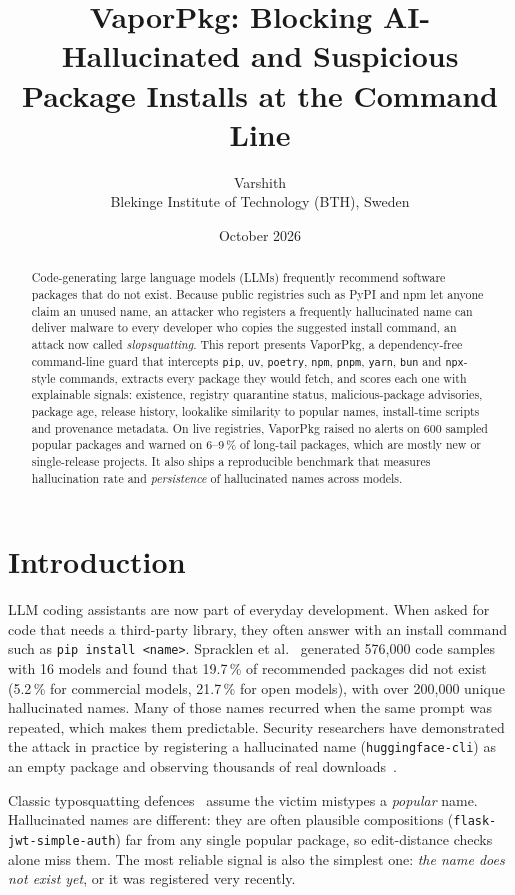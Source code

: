 \documentclass[11pt,a4paper]{article}
\title{\textbf{VaporPkg}: Blocking AI-Hallucinated and Suspicious\\ Package Installs at the Command Line}
\author{Varshith\\ \small Blekinge Institute of Technology (BTH), Sweden}
\date{October 2026}
\begin{document}
\maketitle

\begin{abstract}
Code-generating large language models (LLMs) frequently recommend software packages that do not exist.
Because public registries such as PyPI and npm let anyone claim an unused name, an attacker who registers
a frequently hallucinated name can deliver malware to every developer who copies the suggested install
command, an attack now called \emph{slopsquatting}. This report presents VaporPkg, a dependency-free
command-line guard that intercepts \texttt{pip}, \texttt{uv}, \texttt{poetry}, \texttt{npm}, \texttt{pnpm},
\texttt{yarn}, \texttt{bun} and \texttt{npx}-style commands, extracts every package they would fetch, and
scores each one with explainable signals: existence, registry quarantine status, malicious-package
advisories, package age, release history, lookalike similarity to popular names, install-time scripts and
provenance metadata. On live registries, VaporPkg raised no alerts on 600 sampled popular packages and
warned on 6--9\,\% of long-tail packages, which are mostly new or single-release projects. It also ships
a reproducible benchmark that measures hallucination rate and \emph{persistence} of hallucinated names
across models.
\end{abstract}

\section{Introduction}
LLM coding assistants are now part of everyday development. When asked for code that needs a third-party
library, they often answer with an install command such as \texttt{pip install <name>}. Spracklen et
al.~\cite{spracklen} generated 576{,}000 code samples with 16 models and found that 19.7\,\% of recommended
packages did not exist (5.2\,\% for commercial models, 21.7\,\% for open models), with over 200{,}000
unique hallucinated names. Many of those names recurred when the same prompt was repeated, which makes them
predictable. Security researchers have demonstrated the attack in practice by registering a hallucinated
name (\texttt{huggingface-cli}) as an empty package and observing thousands of real downloads~\cite{lasso}.

Classic typosquatting defences~\cite{spellbound} assume the victim mistypes a \emph{popular} name.
Hallucinated names are different: they are often plausible compositions (\texttt{flask-jwt-simple-auth})
far from any single popular package, so edit-distance checks alone miss them. The most reliable signal is
also the simplest one: \emph{the name does not exist yet}, or it was registered very recently.
\end{document}
